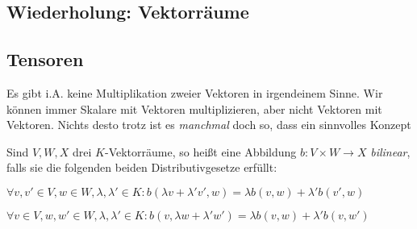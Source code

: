 
\subsection{Wiederholung: Vektorräume}


\subsection{Tensoren}

\begin{remark}
Es gibt i.A. keine Multiplikation zweier Vektoren in irgendeinem Sinne. Wir können immer Skalare mit Vektoren multiplizieren, aber nicht Vektoren mit Vektoren. Nichts desto trotz ist es \emph{manchmal} doch so, dass ein sinnvolles Konzept 
\end{remark}

\begin{definition}
Sind $V,W,X$ drei $K$-Vektorräume, so heißt eine Abbildung $b: V\times W\to X$ \emph{bilinear}, falls sie die folgenden beiden Distributivgesetze erfüllt:
\begin{description}
	\item $\forall v,v'\in V, w\in W, \lambda,\lambda'\in K: b(\lambda v+ \lambda' v', w) = \lambda b(v,w) + \lambda' b(v',w)$
	\item $\forall v\in V,  w,w'\in W, \lambda,\lambda'\in K: b(v,\lambda w+\lambda'w') = \lambda b(v,w) + \lambda' b(v,w')$
\end{description}
\end{definition}

